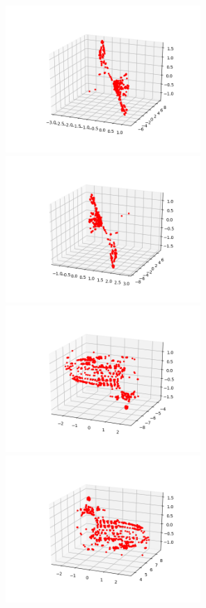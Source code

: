 \documentclass[12pt,fleqn]{article}\usepackage{../../common}
\begin{document}
\includegraphics[width=20em]{vision_20recons_03_0.png}
\includegraphics[width=20em]{vision_20recons_03_1.png}
\includegraphics[width=20em]{vision_20recons_03_2.png}
\includegraphics[width=20em]{vision_20recons_03_3.png}
\end{document}
